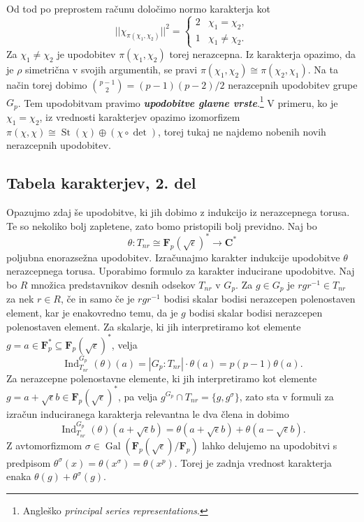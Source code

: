 \documentclass[11pt]{book}
\def\CC{\mathbf{C}}
\def\FF{\mathbf{F}}
\DeclareMathOperator\Ind{Ind}
\DeclareMathOperator\St{St}
\DeclareMathOperator\Gal{Gal}
\def\definicija{\color{rdeca}\bf\em}
\theoremstyle{definition}
\theoremstyle{zgled}
\theoremstyle{odprtproblem}
\theoremstyle{domacanaloga}
\theoremstyle{izrek}
\begin{document}
Od tod po preprostem računu določimo normo karakterja kot
\[
    || \chi_{\pi(\chi_1, \chi_2)} ||^2 = 
    \begin{cases}
        2 & \chi_1 = \chi_2, \\
        1 & \chi_1 \neq \chi_2.
    \end{cases}
\]
Za $\chi_1 \neq \chi_2$ je upodobitev $\pi(\chi_1, \chi_2)$ torej nerazcepna. Iz karakterja opazimo, da je $\rho$ simetrična v svojih argumentih, se pravi $\pi(\chi_1, \chi_2) \cong \pi(\chi_2, \chi_1)$. Na ta način torej dobimo $\binom{p-1}{2} = (p-1)(p-2)/2$ nerazcepnih upodobitev grupe $G_p$. Tem upodobitvam pravimo {\definicija upodobitve glavne vrste}.\footnote{Angleško \emph{principal series representations}.} V primeru, ko je $\chi_1 = \chi_2$, iz vrednosti karakterjev opazimo izomorfizem $\pi(\chi, \chi) \cong \St(\chi) \oplus (\chi \circ \det)$, torej tukaj ne najdemo nobenih novih nerazcepnih upodobitev.

\subsection{Tabela karakterjev, 2. del}

Opazujmo zdaj še upodobitve, ki jih dobimo z indukcijo iz nerazcepnega torusa. Te so nekoliko bolj zapletene, zato bomo pristopili bolj previdno. Naj bo
\[
    \theta \colon T_{nr} \cong \FF_p(\sqrt{\epsilon})^* \to \CC^*
\]
poljubna enorazsežna upodobitev. Izračunajmo karakter indukcije upodobitve $\theta$ nerazcepnega torusa. Uporabimo formulo za karakter inducirane upodobitve. Naj bo $R$ množica predstavnikov desnih odsekov $T_{nr}$ v $G_p$. Za $g \in G_p$ je $r g r^{-1} \in T_{nr}$ za nek $r \in R$, če in samo če je $r g r^{-1}$ bodisi skalar bodisi nerazcepen polenostaven element, kar je enakovredno temu, da je $g$ bodisi skalar bodisi nerazcepen polenostaven element. Za skalarje, ki jih interpretiramo kot elemente $g = a \in \FF_p^* \subseteq \FF_p(\sqrt{\epsilon})^*$, velja
\[
    \textstyle \Ind_{T_{nr}}^{G_p}(\theta)(a) = |G_p : T_{nr}| \cdot \theta(a) = p(p-1) \theta(a).
\]
Za nerazcepne polenostavne elemente, ki jih interpretiramo kot elemente $g = a + \sqrt{\epsilon} b \in \FF_p(\sqrt{\epsilon})^*$, pa velja $g^{G_p} \cap T_{nr} = \{ g, g^{\sigma} \}$, zato sta v formuli za izračun induciranega karakterja relevantna le dva člena in dobimo
\[
    \textstyle \Ind_{T_{nr}}^{G_p}(\theta)(a + \sqrt{\epsilon} b) = \theta(a + \sqrt{\epsilon} b) + \theta(a - \sqrt{\epsilon} b).
\]
Z avtomorfizmom $\sigma \in \Gal(\FF_p(\sqrt{\epsilon})/\FF_p)$ lahko delujemo na upodobitvi s predpisom $\theta^\sigma(x) = \theta(x^\sigma) = \theta(x^p)$. Torej je zadnja vrednost karakterja enaka $\theta(g) + \theta^\sigma(g)$.
\end{document}
